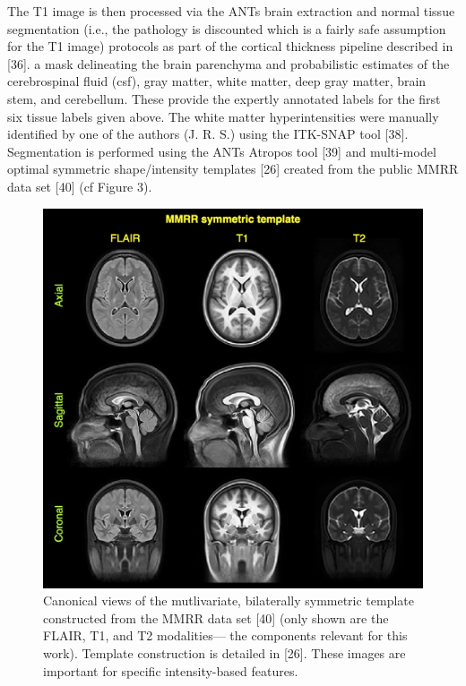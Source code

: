 \documentclass[11pt,]{article}
\begin{document}
The T1 image is then processed via the ANTs brain extraction and normal
tissue segmentation (i.e., the pathology is discounted which is a fairly
safe assumption for the T1 image) protocols as part of the cortical
thickness pipeline described in {[}36{]}.
 a mask delineating the brain
parenchyma and probabilistic estimates of the cerebrospinal fluid (csf),
gray matter, white matter, deep gray matter, brain stem, and cerebellum.
These provide the expertly annotated labels for the first six tissue
labels given above. The white matter hyperintensities were manually
identified by one of the authors (J. R. S.) using the ITK-SNAP tool
{[}38{]}. Segmentation is performed using the ANTs Atropos tool {[}39{]}
and multi-model optimal symmetric shape/intensity templates {[}26{]}
created from the public MMRR data set {[}40{]} (cf Figure 3).

\begin{figure}[htbp]
\centering
\includegraphics{Figures/MMRR.png}
\caption{Canonical views of the mutlivariate, bilaterally symmetric
template constructed from the MMRR data set {[}40{]} (only shown are the
FLAIR, T1, and T2 modalities--- the components relevant for this work).
Template construction is detailed in {[}26{]}. These images are
important for specific intensity-based features.}
\end{figure}
\end{document}
